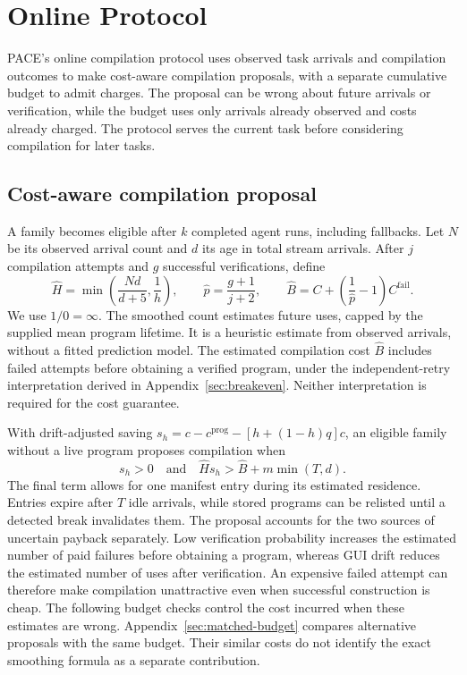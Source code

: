\section{Online Protocol}
\label{sec:policy}

PACE's online compilation protocol uses observed task arrivals and compilation outcomes to make cost-aware compilation proposals, with a separate cumulative budget to admit charges.
The proposal can be wrong about future arrivals or verification, while the budget uses only arrivals already observed and costs already charged.
The protocol serves the current task before considering compilation for later tasks.

\subsection{Cost-aware compilation proposal}
\label{sec:fullpolicy}

A family becomes eligible after $k$ completed agent runs, including fallbacks.
Let $N$ be its observed arrival count and $d$ its age in total stream arrivals.
After $j$ compilation attempts and $g$ successful verifications, define
\begin{equation}
\hat H=\min\!\left(\frac{Nd}{d+5},\frac1h\right),\qquad
\hat p=\frac{g+1}{j+2},\qquad
\hat B=C+\left(\frac1{\hat p}-1\right)C^{\mathrm{fail}}.
\label{eq:estimated-price}
\end{equation}
We use $1/0=\infty$.
The smoothed count estimates future uses, capped by the supplied mean program lifetime.
It is a heuristic estimate from observed arrivals, without a fitted prediction model.
The estimated compilation cost $\hat B$ includes failed attempts before obtaining a verified program, under the independent-retry interpretation derived in Appendix~\ref{sec:breakeven}.
Neither interpretation is required for the cost guarantee.

With drift-adjusted saving $s_h=c-c^{\mathrm{prog}}-[h+(1-h)q]c$, an eligible family without a live program proposes compilation when
\begin{equation}
s_h>0\quad\text{and}\quad\hat Hs_h>\hat B+m\min(T,d).
\label{eq:trigger}
\end{equation}
The final term allows for one manifest entry during its estimated residence.
Entries expire after $T$ idle arrivals, while stored programs can be relisted until a detected break invalidates them.
The proposal accounts for the two sources of uncertain payback separately.
Low verification probability increases the estimated number of paid failures before obtaining a program, whereas GUI drift reduces the estimated number of uses after verification.
An expensive failed attempt can therefore make compilation unattractive even when successful construction is cheap.
The following budget checks control the cost incurred when these estimates are wrong.
Appendix~\ref{sec:matched-budget} compares alternative proposals with the same budget.
Their similar costs do not identify the exact smoothing formula as a separate contribution.

